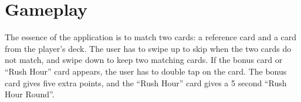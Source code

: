 \section{Gameplay}
The essence of the application is to match two cards: a reference card and a card from the player’s deck. The user has to swipe up to skip when the two cards do not match, and swipe down to keep two matching cards. If the bonus card or “Rush Hour” card appears, the user has to double tap on the card. The bonus card gives five extra points, and the “Rush Hour” card gives a 5 second “Rush Hour Round”.